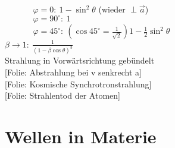 \documentclass[titlepage,12pt,a4paper,ngerman]{report}
\newcommand{\folie}[1]{\color{gray}[Folie: #1]\color{black}}
\begin{document}
\begin{enumerate}[i)]
\begin{itemize}
		$\phantom{\qquad \quad \ \, }  \varphi = 0 :  \ 1 - \sin ^2 \theta  $ (wieder $ \perp \vec{a} $)\\
		$\phantom{\qquad \quad \ \, } \varphi = 90^\circ : \ 1 $\\
		$\phantom{\qquad \quad \ \, } \varphi = 45^\circ : \ (\cos 45^\circ = \frac{1}{\sqrt{2}} )  1 - \frac{1}{2} \sin^2 \theta $\\
		$ \beta \rightarrow 1 : \ \frac{1}{(1 - \beta \cos \theta)^3} $\\[5pt]
		\phantom{\qquad \quad \, } Strahlung in Vorwärtsrichtung gebündelt\\
		\phantom{\qquad \quad \, } \folie{Abstrahlung bei v senkrecht a} \\ \phantom{\qquad \quad \, } \folie{Kosmische Synchrotronstrahlung} \\
		\phantom{\qquad \quad \, } \folie{Strahlentod der Atomen}
	\end{itemize}
\end{enumerate}

\section{Wellen in Materie}
\end{document}
